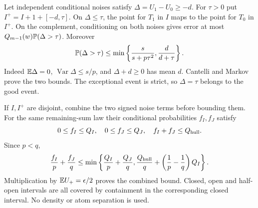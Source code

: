 Let independent conditional noises satisfy $\Delta=U_1-U_0\ge-d$.
For $\tau>0$ put $I^+=I+1+[-d,\tau]$. On $\Delta\le\tau$, the
point for $T_1$ in $I$ maps to the point for $T_0$ in $I^+$. On the
complement, conditioning on both noises gives error at most
$Q_{m-1}(w)\mathbb P(\Delta>\tau)$. Moreover
\begin{equation}\label{j:local:conf:bad}
 \mathbb P(\Delta>\tau)\le
 \min\left\{\frac{s}{s+p\tau^2},\frac d{d+\tau}\right\}.
\end{equation}
Indeed $\mathbb E\Delta=0$, $\operatorname{Var}\Delta\le s/p$, and
$\Delta+d\ge0$ has mean $d$. Cantelli and Markov prove the two bounds.
The exceptional event is strict, so $\Delta=\tau$ belongs to the good event.

If $I,I^+$ are disjoint, combine the two signed noise terms before
bounding them. For the same remaining-sum law their conditional
probabilities $f_I,f_J$ satisfy
\[
 0\le f_I\le Q_I,\quad0\le f_J\le Q_J,\quad f_I+f_J\le Q_{\rm hull}.
\]
Since $p<q$,
\[
 \frac{f_I}{p}+\frac{f_J}{q}
 \le\min\left\{\frac{Q_I}p+\frac{Q_J}q,
 \frac{Q_{\rm hull}}q+\left(\frac1p-\frac1q\right)Q_I\right\}.
\]
Multiplication by $\mathbb E U_+=\epsilon/2$ proves the combined bound.
Closed, open and half-open intervals are all covered by containment in
the corresponding closed interval. No density or atom separation is used.

